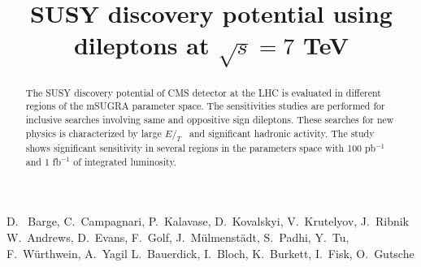 \documentclass{cmspaper}
\newcommand{\met} {\ensuremath{E\!\!\!\!/_T}}
\begin{document}
%
\begin{titlepage}
\title{SUSY discovery potential using dileptons at $\sqrt{s} = 7 $ TeV}

  \begin{Authlist}
    D.~ Barge, C.~Campagnari, P.~Kalavase, D.~Kovalskyi, V.~Krutelyov, J.~Ribnik
    W.~Andrews, D.~Evans, F.~Golf, J.~M\"ulmenst\"adt, S.~Padhi, Y.~Tu, F.~W\"urthwein, A.~Yagil
    L.~Bauerdick, I.~Bloch, K.~Burkett, I.~Fisk, O.~Gutsche
  \end{Authlist}

\begin{abstract}
The SUSY discovery potential of CMS detector at the LHC is evaluated in different
regions of the mSUGRA parameter space. The sensitivities studies are performed 
for inclusive searches involving same and oppositive sign dileptons. These searches
for new physics is characterized by large \met~ and significant hadronic
activity. The study shows significant sensitivity in several regions in the parameters 
space with 100 pb$^{-1}$ and 1 fb$^{-1}$ of integrated luminosity.

\end{abstract}
\end{titlepage}









\clearpage

\end{document}
